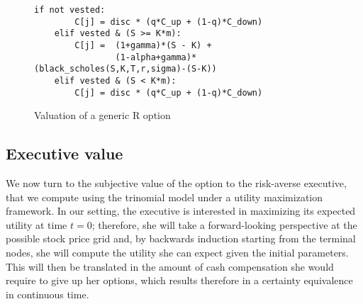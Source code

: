 \begin{figure}
    \begin{lstlisting}[breaklines, basicstyle=\ttfamily\small] 
    if not vested:                         
        C[j] = disc * (q*C_up + (1-q)*C_down)
    elif vested & (S >= K*m):                
        C[j] =  (1+gamma)*(S - K) + 
                (1-alpha+gamma)*(black_scholes(S,K,T,r,sigma)-(S-K))
    elif vested & (S < K*m):  
        C[j] = disc * (q*C_up + (1-q)*C_down)
    \end{lstlisting}
    \caption{Valuation of a generic R option}
    \label{fig:val_r}
\end{figure}



\subsection{Executive value}



We now turn to the subjective value of the option to the risk-averse executive, that we compute using the trinomial model under a utility maximization framework. In our setting, the executive is interested in maximizing its expected utility at time $t=0$; therefore, she will take a forward-looking perspective at the possible stock price grid and, by backwards induction starting from the terminal nodes, she will compute the utility she can expect given the initial parameters. This will then be translated in the amount of cash compensation she would require to give up her options, which results therefore in a certainty equivalence in continuous time. 

